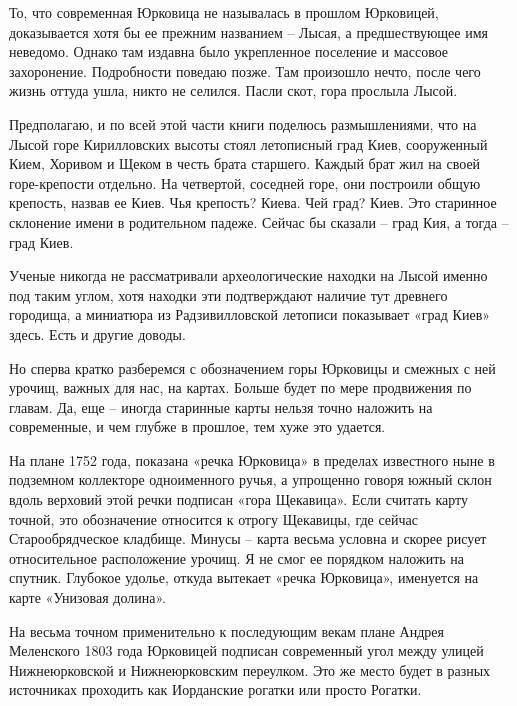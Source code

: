 То, что современная Юрковица не называлась в прошлом Юрковицей, доказывается хотя бы ее прежним названием – Лысая, а предшествующее имя неведомо. Однако там издавна было укрепленное поселение и массовое захоронение. Подробности поведаю позже. Там произошло нечто, после чего жизнь оттуда ушла, никто не селился. Пасли скот, гора прослыла Лысой.

Предполагаю, и по всей этой части книги поделюсь размышлениями, что на Лысой горе Кирилловских высоты стоял летописный град Киев, сооруженный Кием, Хоривом и Щеком в честь брата старшего. Каждый брат жил на своей горе-крепости отдельно. На четвертой, соседней горе, они построили общую крепость, назвав ее Киев. Чья крепость? Киева. Чей град? Киев. Это старинное склонение имени в родительном падеже. Сейчас бы сказали – град Кия, а тогда – град Киев.

Ученые никогда не рассматривали археологические находки на Лысой именно под таким углом, хотя находки эти подтверждают наличие тут древнего городища, а миниатюра из Радзивилловской летописи показывает «град Киев» здесь. Есть и другие доводы.

Но сперва кратко разберемся с обозначением горы Юрковицы и смежных с ней урочищ, важных для нас, на картах. Больше будет по мере продвижения по главам. Да, еще – иногда старинные карты нельзя точно наложить на современные, и чем глубже в прошлое, тем хуже это удается.

На плане 1752 года, показана «речка Юрковица» в пределах известного ныне в подземном коллекторе одноименного ручья, а упрощенно говоря южный склон вдоль верховий этой речки подписан «гора Щекавица». Если считать карту точной, это обозначение относится к отрогу Щекавицы, где сейчас Старообрядческое кладбище. Минусы – карта весьма условна и скорее рисует относительное расположение урочищ. Я не смог ее порядком наложить на спутник. Глубокое удолье, откуда вытекает «речка Юрковица», именуется на карте «Унизовая долина».

На весьма точном применительно к последующим векам плане Андрея Меленского 1803 года Юрковицей подписан современный угол между улицей Нижнеюрковской и Нижнеюрковским переулком. Это же место будет в разных источниках проходить как Иорданские рогатки или просто Рогатки.


